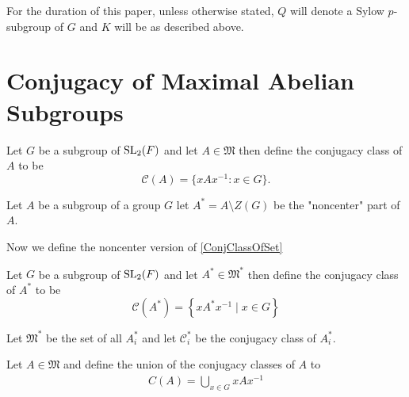 For the duration of this paper, unless otherwise stated, $Q$ will denote a Sylow $p$-subgroup of $G$ and $K$ will be as described above. 


\section{Conjugacy of Maximal Abelian Subgroups}

\begin{definition}
  \label{ConjClassOfSet}
  \leanok
  Let $G$ be a subgroup of $\operatorname{SL}_2(F)$ and let $A \in \mathfrak{M}$ then define the conjugacy class of $A$ to be 
  \[
  \mathcal{C}(A) = \{ x A x^{-1} : x \in G \}.
  \]
\end{definition}

\begin{definition}
  \label{Subgroup.noncenter}
  \leanok
  Let $A$ be a subgroup of a group $G$ let $A^* = A \setminus Z(G)$ be the "noncenter" part of $A$.
\end{definition}

Now we define the noncenter version of \ref{ConjClassOfSet}

\begin{definition}
  \label{noncenter_ConjClassOfSet}
  \leanok
  Let $G$ be a subgroup of $\operatorname{SL}_2(F)$ and let $A^* \in \mathfrak{M}^*$ then define the conjugacy class of $A^*$ to be
  \[
  \mathcal{C}(A^*) = \left\{x A^* x^{-1} \; | \; x \in G \right\}
   \]
\end{definition}

\begin{definition}
\label{noncenter_MaximalAbelianSubgroupsOf}
\leanok
Let $\mathfrak{M}^*$ be the set of all $A_i^*$ and let $\mathcal{C}_i^*$ be the conjugacy class of $A_i^*$. \\
\end{definition}

\begin{definition}
\label{C}
\leanok
Let $A \in \mathfrak{M}$ and define the union of the conjugacy classes of $A$ to
\begin{align*} 
  C(A) = \bigcup_{x \in G} x A x^{-1}
\end{align*}
\end{definition}

